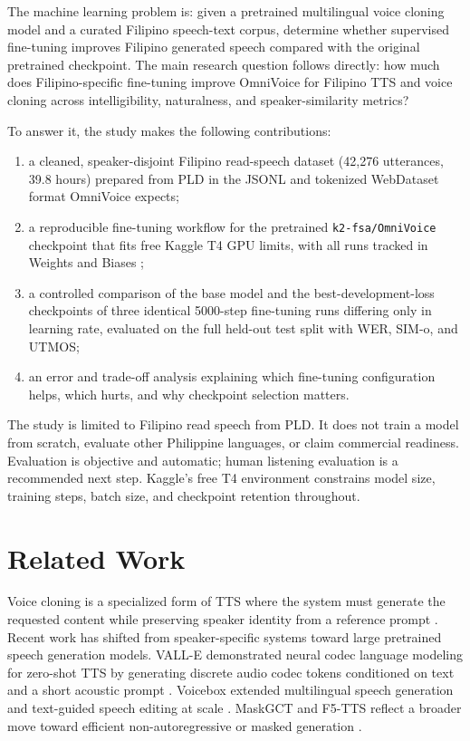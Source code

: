 \documentclass[sigconf,nonacm]{acmart}
\begin{document}
The machine learning problem is: given a pretrained multilingual voice cloning model and a curated Filipino speech-text corpus, determine whether supervised fine-tuning improves Filipino generated speech compared with the original pretrained checkpoint. The main research question follows directly: how much does Filipino-specific fine-tuning improve OmniVoice for Filipino TTS and voice cloning across intelligibility, naturalness, and speaker-similarity metrics?

To answer it, the study makes the following contributions:

\begin{enumerate}
  \item a cleaned, speaker-disjoint Filipino read-speech dataset (42,276 utterances, 39.8 hours) prepared from PLD in the JSONL and tokenized WebDataset format OmniVoice expects;
  \item a reproducible fine-tuning workflow for the pretrained \texttt{k2-fsa/OmniVoice} checkpoint that fits free Kaggle T4 GPU limits, with all runs tracked in Weights and Biases \cite{wandb};
  \item a controlled comparison of the base model and the best-development-loss checkpoints of three identical 5000-step fine-tuning runs differing only in learning rate, evaluated on the full held-out test split with WER, SIM-o, and UTMOS;
  \item an error and trade-off analysis explaining which fine-tuning configuration helps, which hurts, and why checkpoint selection matters.
\end{enumerate}

The study is limited to Filipino read speech from PLD. It does not train a model from scratch, evaluate other Philippine languages, or claim commercial readiness. Evaluation is objective and automatic; human listening evaluation is a recommended next step. Kaggle's free T4 environment constrains model size, training steps, batch size, and checkpoint retention throughout.

\section{Related Work}

Voice cloning is a specialized form of TTS where the system must generate the requested content while preserving speaker identity from a reference prompt \cite{voicecloningsurvey}. Recent work has shifted from speaker-specific systems toward large pretrained speech generation models. VALL-E demonstrated neural codec language modeling for zero-shot TTS by generating discrete audio codec tokens conditioned on text and a short acoustic prompt \cite{valle}. Voicebox extended multilingual speech generation and text-guided speech editing at scale \cite{voicebox}. MaskGCT and F5-TTS reflect a broader move toward efficient non-autoregressive or masked generation \cite{maskgct,f5tts}.
\end{document}
